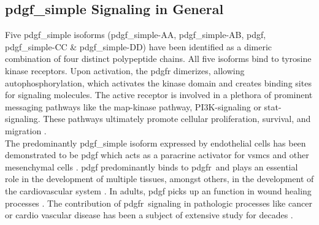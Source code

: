     \subsection{\ac{pdgf_simple} Signaling in General}
    \label{subsec:pdgf_the_cytokine}
    Five \ac{pdgf_simple} isoforms (\ac{pdgf_simple}-AA, \ac{pdgf_simple}-AB, \ac{pdgf}, \ac{pdgf_simple}-CC \& \ac{pdgf_simple}-DD) have been identified as a dimeric combination of four distinct polypeptide chains. All five isoforms bind to tyrosine kinase receptors. Upon activation, the \ac{pdgfr} dimerizes, allowing autophosphorylation, which activates the kinase domain and creates binding sites for signaling molecules. The active receptor is involved in a plethora of prominent messaging pathways like the \ac{map}-kinase pathway, \ac{PI3K}-signaling or \ac{stat}-signaling. These pathways ultimately promote cellular proliferation, survival, and migration \cite{chenPlateletderivedGrowthFactors2013, heldinTargetingPDGFSignaling2013, huTargetingPlateletderivedGrowth2015}.\\
    The predominantly \ac{pdgf_simple} isoform expressed by endothelial cells has been demonstrated to be \ac{pdgf} \cite{andraeRolePlateletderivedGrowth2008, heldinTargetingPDGFSignaling2013} which acts as a paracrine activator for \acp{vsmc} and other mesenchymal cells \cite{heldinTargetingPDGFSignaling2013}. \ac{pdgf} predominantly binds to \ac{pdgfr}\beta~and plays an essential role in the development of multiple tissues, amongst others, in the development of the cardiovascular system \cite{leveenMiceDeficientPDGF1994}. In adults, \ac{pdgf} picks up an function in wound healing processes \cite{robsonPlateletderivedGrowthFactor1992}. The contribution of \ac{pdgfr}\beta~signaling in pathologic processes like cancer or cardio vascular disease has been a subject of extensive study for decades \cite{heldinTargetingPDGFSignaling2013, rainesPDGFCardiovascularDisease2004}.


